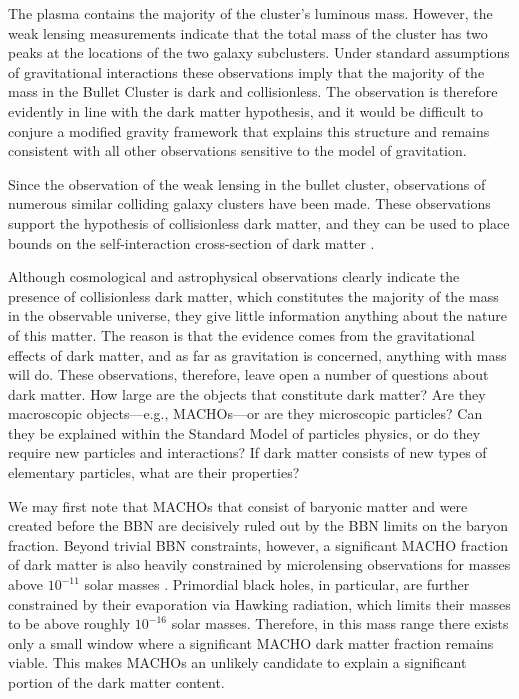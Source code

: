 \documentclass[b5paper, 10pt, twoside]{book}
\begin{document}
The plasma contains the majority of the cluster's luminous mass. However, the weak lensing measurements indicate that the total mass of the cluster has two peaks at the locations of the two galaxy subclusters. Under standard assumptions of gravitational interactions these observations imply that the majority of the mass in the Bullet Cluster is dark and collisionless. The observation is therefore evidently in line with the dark matter hypothesis, and it would be difficult to conjure a modified gravity framework that explains this structure and remains consistent with all other observations sensitive to the model of gravitation.

Since the observation of the weak lensing in the bullet cluster, observations of numerous similar colliding galaxy clusters have been made. These observations support the hypothesis of collisionless dark matter, and they can be used to place bounds on the self-interaction cross-section of dark matter \parencite{HarveyEtAl2015}.

Although cosmological and astrophysical observations clearly indicate the presence of collisionless dark matter, which constitutes the majority of the mass in the observable universe, they give little information anything about the nature of this matter. The reason is that the evidence comes from the gravitational effects of dark matter, and as far as gravitation is concerned, anything with mass will do. These observations, therefore, leave open a number of questions about dark matter. How large are the objects that constitute dark matter? Are they macroscopic objects---e.g., MACHOs---or are they microscopic particles? Can they be explained within the Standard Model of particles physics, or do they require new particles and interactions? If dark matter consists of new types of elementary particles, what are their properties?

We may first note that MACHOs that consist of baryonic matter and were created before the BBN are decisively ruled out by the BBN limits on the baryon fraction. Beyond trivial BBN constraints, however, a significant MACHO fraction of dark matter is also heavily constrained by microlensing observations for masses above $10^{-11}$ solar masses \parencite{BirdEtAl2023}. Primordial black holes, in particular, are further constrained by their evaporation via Hawking radiation, which limits their masses to be above roughly $10^{-16}$ solar masses. Therefore, in this mass range there exists only a small window where a significant MACHO dark matter fraction remains viable. This makes MACHOs an unlikely candidate to explain a significant portion of the dark matter content.
\end{document}
